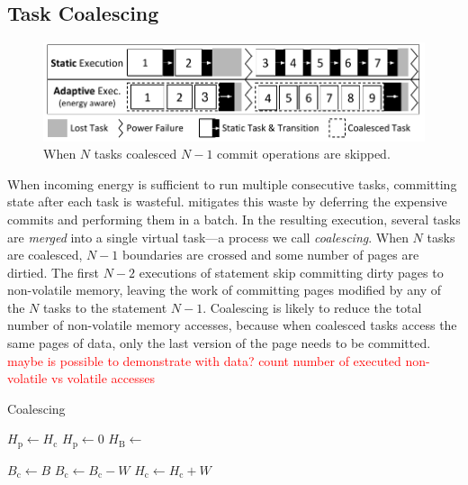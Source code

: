 \subsection{Task Coalescing}

\begin{figure}
	\centering
	\includegraphics[width=0.5\columnwidth]{figures/coal_Intro_Figure.pdf}
	\caption{When $N$ tasks coalesced $N-1$ commit operations are skipped.}
	\label{fig:coalIntro}
\end{figure}

When incoming energy is sufficient to run multiple consecutive tasks,
committing state after each task is wasteful. \sys mitigates this
waste by deferring the expensive commits and performing them in a
batch. In the resulting execution, several tasks are \emph{merged} into a
single virtual task---a process we call \emph{coalescing}. 
%
When $N$ tasks are coalesced, $N-1$ boundaries are crossed and some number of
pages are dirtied. The first $N-2$ executions of \transition statement skip
committing dirty pages to non-volatile memory, leaving the work of committing
pages modified by any of the $N$ tasks to the statement $N-1$.
Coalescing is likely to reduce the total number of non-volatile memory
accesses, because when coalesced tasks access the same pages of data, only the
last version of the page needs to be committed.  \textcolor{red}{maybe is possible to demonstrate with data? count number of executed non-volatile vs volatile accesses}

\begin{algorithm}
	\caption{Coalescing}
	\label{algo:genCoalescing}
	\scriptsize
	\begin{algorithmic}[1]
        \State $H_\text{p} \gets H_\text{c}$
        \State $H_\text{p} \gets 0$ 
        \State $H_\text{B} \leftarrow $ 

	        \State $ B_\text{c} \gets B$
		        \State {}
		        \State $B_\text{c} \gets B_\text{c} - W$
				\State $H_\text{c} \gets H_\text{c} + W$
	        \EndWhile
	        \State {}
        \EndWhile
	\end{algorithmic}
\end{algorithm}

